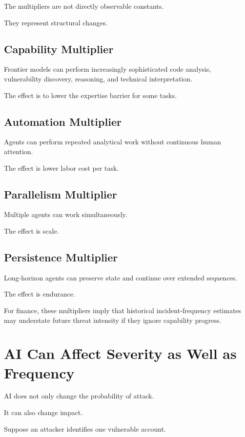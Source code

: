 The multipliers are not directly observable constants.

They represent structural changes.

\subsection{Capability Multiplier}

Frontier models can perform increasingly sophisticated code analysis, vulnerability discovery, reasoning, and technical interpretation.

The effect is to lower the expertise barrier for some tasks.

\subsection{Automation Multiplier}

Agents can perform repeated analytical work without continuous human attention.

The effect is lower labor cost per task.

\subsection{Parallelism Multiplier}

Multiple agents can work simultaneously.

The effect is scale.

\subsection{Persistence Multiplier}

Long-horizon agents can preserve state and continue over extended sequences.

The effect is endurance.

For finance, these multipliers imply that historical incident-frequency estimates may understate future threat intensity if they ignore capability progress.

\section{AI Can Affect Severity as Well as Frequency}

AI does not only change the probability of attack.

It can also change impact.

Suppose an attacker identifies one vulnerable account.

